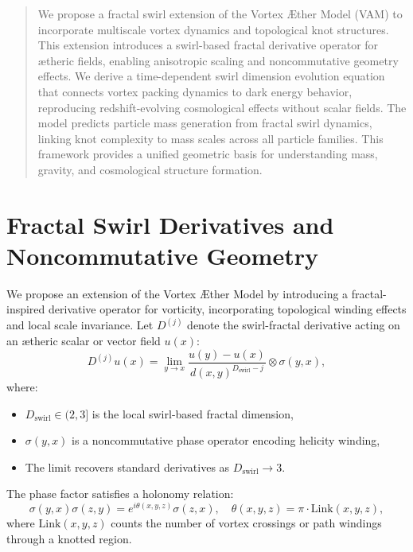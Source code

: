 \documentclass[11pt]{article}
\begin{document}
    \titlepageOpen
    \begin{abstract}
        We propose a fractal swirl extension of the Vortex \AE ther Model (VAM) to incorporate multiscale vortex dynamics and topological knot structures. This extension introduces a swirl-based fractal derivative operator for ætheric fields, enabling anisotropic scaling and noncommutative geometry effects. We derive a time-dependent swirl dimension evolution equation that connects vortex packing dynamics to dark energy behavior, reproducing redshift-evolving cosmological effects without scalar fields. The model predicts particle mass generation from fractal swirl dynamics, linking knot complexity to mass scales across all particle families. This framework provides a unified geometric basis for understanding mass, gravity, and cosmological structure formation.
        \end{abstract}
    \titlepageClose

    \section{Fractal Swirl Derivatives and Noncommutative Geometry}

    We propose an extension of the Vortex \AE ther Model by introducing a fractal-inspired derivative operator for vorticity, incorporating topological winding effects and local scale invariance. Let \( D^{(j)} \) denote the swirl-fractal derivative acting on an ætheric scalar or vector field \( u(x) \):
    \[
        D^{(j)} u(x) = \lim_{y \to x} \frac{u(y) - u(x)}{d(x,y)^{D_\text{swirl} - j}} \otimes \sigma(y,x),
    \]
    where:
    \begin{itemize}
        \item \( D_\text{swirl} \in (2, 3] \) is the local swirl-based fractal dimension,
        \item \( \sigma(y,x) \) is a noncommutative phase operator encoding helicity winding,
        \item The limit recovers standard derivatives as \( D_\text{swirl} \to 3 \).
    \end{itemize}

    The phase factor satisfies a holonomy relation:
    \[
        \sigma(y,x) \sigma(z,y) = e^{i\theta(x,y,z)} \sigma(z,x), \quad \theta(x,y,z) = \pi \cdot \text{Link}(x,y,z),
    \]
    where \( \text{Link}(x,y,z) \) counts the number of vortex crossings or path windings through a knotted region.
\end{document}
